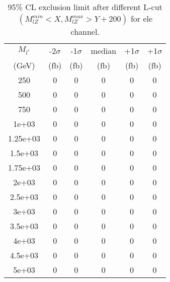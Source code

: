 \documentclass[]{article}
\begin{document}
\begin{table}
\begin{center}
\begin{tabular}{cccccc}
\hline 
\hline 
$M_{l^*}$ & -2$\sigma$ & -1$\sigma$ & median & +1$\sigma$ & +1$\sigma$\\ 
(GeV) & (fb) & (fb) & (fb) & (fb) & (fb)  \\ 
\hline 
\hline 
250 & 0 & 0 & 0 & 0 & 0\\
500 & 0 & 0 & 0 & 0 & 0\\
750 & 0 & 0 & 0 & 0 & 0\\
1e+03 & 0 & 0 & 0 & 0 & 0\\
1.25e+03 & 0 & 0 & 0 & 0 & 0\\
1.5e+03 & 0 & 0 & 0 & 0 & 0\\
1.75e+03 & 0 & 0 & 0 & 0 & 0\\
2e+03 & 0 & 0 & 0 & 0 & 0\\
2.5e+03 & 0 & 0 & 0 & 0 & 0\\
3e+03 & 0 & 0 & 0 & 0 & 0\\
3.5e+03 & 0 & 0 & 0 & 0 & 0\\
4e+03 & 0 & 0 & 0 & 0 & 0\\
4.5e+03 & 0 & 0 & 0 & 0 & 0\\
5e+03 & 0 & 0 & 0 & 0 & 0\\
\hline 
\end{tabular}
\caption{95\% CL exclusion limit after different L-cut $(M_{lZ}^{min} < X, M_{lZ}^{max} > Y + 200)$ for ele channel.}
\label{tab:limit_electron}
\end{center}
\end{table}
\end{document}
